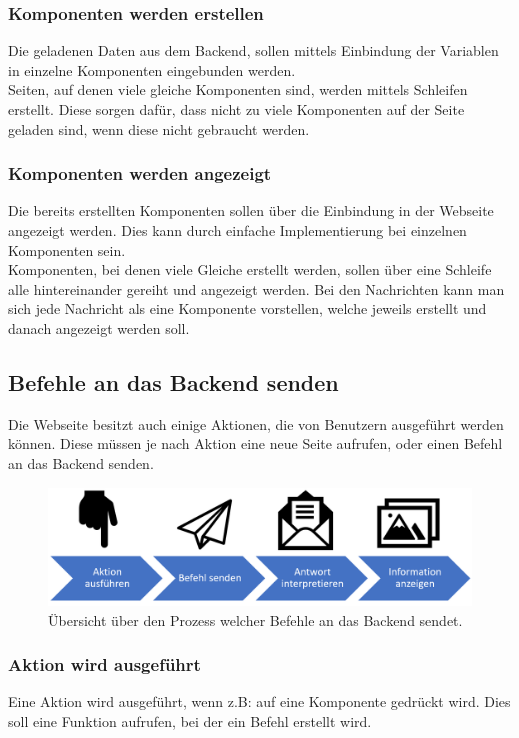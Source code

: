 \subsubsection{Komponenten werden erstellen}
Die geladenen Daten aus dem Backend, sollen mittels Einbindung der Variablen in einzelne Komponenten eingebunden werden.\\Seiten, auf denen viele gleiche Komponenten sind, werden mittels Schleifen erstellt. Diese sorgen dafür, dass nicht zu viele Komponenten auf der Seite geladen sind, wenn diese nicht gebraucht werden.

\subsubsection{Komponenten werden angezeigt}
Die bereits erstellten Komponenten sollen über die Einbindung in der Webseite angezeigt werden. Dies kann durch einfache Implementierung bei einzelnen Komponenten sein.\\Komponenten, bei denen viele Gleiche erstellt werden, sollen über eine Schleife alle hintereinander gereiht und angezeigt werden.
Bei den Nachrichten kann man sich jede Nachricht als eine Komponente vorstellen, welche jeweils erstellt und danach angezeigt werden soll.
\newpage
\subsection{Befehle an das Backend senden}
Die Webseite besitzt auch einige Aktionen, die von Benutzern ausgeführt werden können. Diese müssen je nach Aktion eine neue Seite aufrufen, oder einen Befehl an das Backend senden.

\begin{figure}[H]
	\centering
	\includegraphics[width=0.8\linewidth]{images/Prozess_Befehl_senden}
	\caption[Prozess der Befehlssendung]{Übersicht über den Prozess welcher Befehle an das Backend sendet.}
	\label{fig:prozessbefehlsenden}
\end{figure}

\subsubsection{Aktion wird ausgeführt}
Eine Aktion wird ausgeführt, wenn z.B: auf eine Komponente gedrückt wird. Dies soll eine Funktion aufrufen, bei der ein Befehl erstellt wird.

